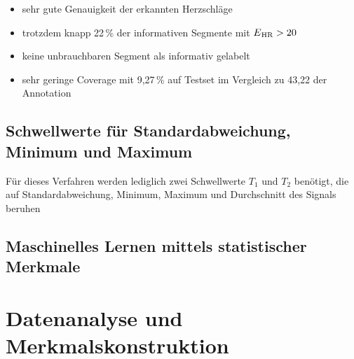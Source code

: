 \begin{itemize}
	\item sehr gute Genauigkeit der erkannten Herzschläge
	\item trotzdem knapp 22\,\% der informativen Segmente mit $E\textsubscript{HR} > 20$
	\item keine unbrauchbaren Segment als informativ gelabelt
	\item sehr geringe Coverage mit 9{,}27\,\% auf Testset im Vergleich zu 43{,}22 der Annotation
\end{itemize}


\subsection{Schwellwerte für Standardabweichung, Minimum und Maximum}

Für dieses Verfahren werden lediglich zwei Schwellwerte $T_1$ und $T_2$ benötigt, die auf Standardabweichung, Minimum, Maximum und Durchschnitt des Signals beruhen

\subsection{Maschinelles Lernen mittels statistischer Merkmale}

\section{Datenanalyse und Merkmalskonstruktion}


